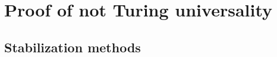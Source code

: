%
%
%
%
%
%
%
%
%
%
%
%




\section{Proof of not Turing universality}

\subsection{Stabilization methods}


